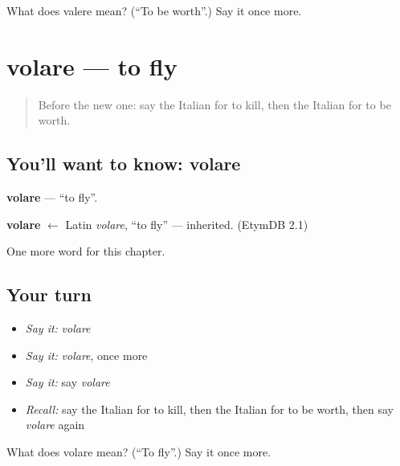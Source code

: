 \begin{tcolorbox}[breakable,colback=teal!4,colframe=teal!35!black,title={Before you move on}]
What does valere mean? (\textquotedblleft{}To be worth\textquotedblright{}.) Say it once more.
\end{tcolorbox}
\section[volare]{volare — to fly}

\label{lesson:IT-C182-volare}



\begin{quote}
Before the new one: say the Italian for to kill, then the Italian for to be worth.
\end{quote}

\subsection*{You'll want to know: volare}
\textbf{volare} — \textquotedblleft{}to fly\textquotedblright{}.

\begin{cousinweb}
\textbf{volare} $\leftarrow$ Latin \emph{volare}, \textquotedblleft{}to fly\textquotedblright{} — inherited. (EtymDB 2.1)
\end{cousinweb}

\begin{grammarlens}[title={What you've built}]
One more word for this chapter.
\end{grammarlens}

\subsection*{Your turn}
\begin{itemize}
\raggedright
  \item \emph{Say it:} \emph{volare}
  \item \emph{Say it:} \emph{volare}, once more
  \item \emph{Say it:} say \emph{volare}
  \item \emph{Recall:} say the Italian for to kill, then the Italian for to be worth, then say \emph{volare} again
\end{itemize}

\begin{tcolorbox}[breakable,colback=teal!4,colframe=teal!35!black,title={Before you move on}]
What does volare mean? (\textquotedblleft{}To fly\textquotedblright{}.) Say it once more.
\end{tcolorbox}
